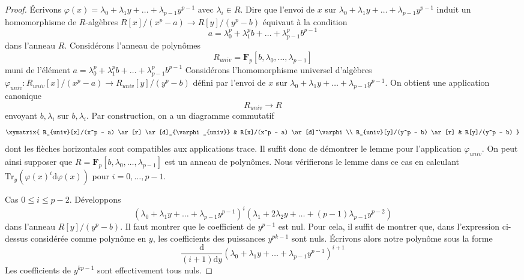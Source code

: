 \begin{proof} Écrivons $\varphi(x) = \lambda_0 + \lambda_1 y + \ldots + \lambda_{p - 1}y^{p - 1}$ avec $\lambda_i \in R$. Dire que l'envoi de $x$ sur $\lambda_0 + \lambda_1 y + \ldots + \lambda_{p - 1}y^{p - 1}$ induit un homomorphisme de $R$-algèbres $R[x]/(x^p - a) \to R[y]/(y^p - b)$ équivaut à la condition $$
a = \lambda_0^p + \lambda_1^p b + \ldots + \lambda_{p - 1}^pb^{p - 1}
$$ dans l'anneau $R$. Considérons l'anneau de polynômes $$
R_{univ} = \mathbf{F}_p[b, \lambda_0, \ldots, \lambda_{p - 1}]
$$ muni de l'élément $a = \lambda_0^p + \lambda_1^p b + \ldots + \lambda_{p - 1}^pb^{p - 1}$ Considérons l'homomorphisme universel d'algèbres $\varphi_{univ} : R_{univ}[x]/(x^p - a) \to R_{univ}[y]/(y^p - b)$ défini par l'envoi de $x$ sur $\lambda_0 + \lambda_1 y + \ldots + \lambda_{p - 1}y^{p - 1}$. On obtient une application canonique $$
R_{univ} \longrightarrow R
$$ envoyant $b, \lambda_i$ sur $b, \lambda_i$. Par construction, on a un diagramme commutatif $$
\xymatrix{
R_{univ}[x]/(x^p - a) \ar[r] \ar[d]_{\varphi_{univ}} &
R[x]/(x^p - a) \ar[d]^\varphi \\
R_{univ}[y]/(y^p - b) \ar[r] & R[y]/(y^p - b)
}
$$ dont les flèches horizontales sont compatibles aux applications trace. Il suffit donc de démontrer le lemme pour l'application $\varphi_{univ}$. On peut ainsi supposer que $R = \mathbf{F}_p[b, \lambda_0, \ldots, \lambda_{p - 1}]$ est un anneau de polynômes. Nous vérifierons le lemme dans ce cas en calculant $\text{Tr}_y(\varphi(x)^i\text{d}\varphi(x))$ pour $i = 0 , \ldots, p - 1$.

\medskip\noindent Cas $0 \leq i \leq p - 2$. Développons $$
(\lambda_0 + \lambda_1 y + \ldots + \lambda_{p - 1}y^{p - 1})^i
(\lambda_1 + 2 \lambda_2 y + \ldots + (p - 1)\lambda_{p - 1}y^{p - 2})
$$ dans l'anneau $R[y]/(y^p - b)$. Il faut montrer que le coefficient de $y^{p - 1}$ est nul. Pour cela, il suffit de montrer que, dans l'expression ci-dessus considérée comme polynôme en $y$, les coefficients des puissances $y^{pk - 1}$ sont nuls. Écrivons alors notre polynôme sous la forme $$
\frac{\text{d}}{(i + 1)\text{d}y}
(\lambda_0 + \lambda_1 y + \ldots + \lambda_{p - 1}y^{p - 1})^{i + 1}
$$ Les coefficients de $y^{kp - 1}$ sont effectivement tous nuls.


\end{proof}
